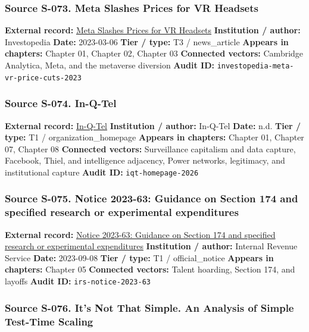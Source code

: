 \documentclass[
  american,
  11pt,
  letterpaper,
]{article}
\begin{document}
\subsubsection{Source S-073. Meta Slashes Prices for VR
Headsets}\label{source-s-073-meta-slashes-prices-for-vr-headsets}

\textbf{External record:}
\href{https://www.investopedia.com/meta-slashes-prices-for-vr-headsets-7197643}{Meta
Slashes Prices for VR Headsets} \textbf{Institution / author:}
Investopedia \textbf{Date:} 2023-03-06 \textbf{Tier / type:} T3 /
news\_article \textbf{Appears in chapters:} Chapter 01, Chapter 02,
Chapter 03 \textbf{Connected vectors:} Cambridge Analytica, Meta, and
the metaverse diversion \textbf{Audit ID:}
\texttt{investopedia-meta-vr-price-cuts-2023}

\subsubsection{Source S-074. In-Q-Tel}\label{source-s-074-in-q-tel}

\textbf{External record:} \href{https://www.iqt.org/}{In-Q-Tel}
\textbf{Institution / author:} In-Q-Tel \textbf{Date:} n.d. \textbf{Tier
/ type:} T1 / organization\_homepage \textbf{Appears in chapters:}
Chapter 01, Chapter 07, Chapter 08 \textbf{Connected vectors:}
Surveillance capitalism and data capture, Facebook, Thiel, and
intelligence adjacency, Power networks, legitimacy, and institutional
capture \textbf{Audit ID:} \texttt{iqt-homepage-2026}

\subsubsection{Source S-075. Notice 2023-63: Guidance on Section 174 and
specified research or experimental
expenditures}\label{source-s-075-notice-2023-63-guidance-on-section-174-and-specified-research-or-experimental-expenditures}

\textbf{External record:}
\href{https://www.irs.gov/pub/irs-drop/n-23-63.pdf}{Notice 2023-63:
Guidance on Section 174 and specified research or experimental
expenditures} \textbf{Institution / author:} Internal Revenue Service
\textbf{Date:} 2023-09-08 \textbf{Tier / type:} T1 / official\_notice
\textbf{Appears in chapters:} Chapter 05 \textbf{Connected vectors:}
Talent hoarding, Section 174, and layoffs \textbf{Audit ID:}
\texttt{irs-notice-2023-63}

\subsubsection{Source S-076. It's Not That Simple. An Analysis of Simple
Test-Time
Scaling}\label{source-s-076-it-s-not-that-simple-an-analysis-of-simple-test-time-scaling}
\end{document}
